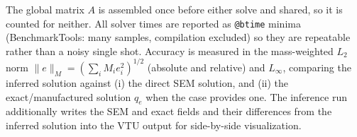 \documentclass[11pt]{article}
\begin{document}
\noindent The global matrix $A$ is assembled once before either solve and shared, so it
is counted for neither. All solver times are reported as \texttt{@btime} minima
(BenchmarkTools: many samples, compilation excluded) so they are repeatable rather than
a noisy single shot. Accuracy is measured in the mass-weighted $L_2$ norm
$\|e\|_M=(\sum_i M_i e_i^2)^{1/2}$ (absolute and relative) and $L_\infty$, comparing the
inferred solution against (i) the direct SEM solution, and (ii) the exact/manufactured
solution $q_e$ when the case provides one. The inference run additionally writes the SEM
and exact fields and their differences from the inferred solution into the VTU output for
side-by-side visualization.
\end{document}
